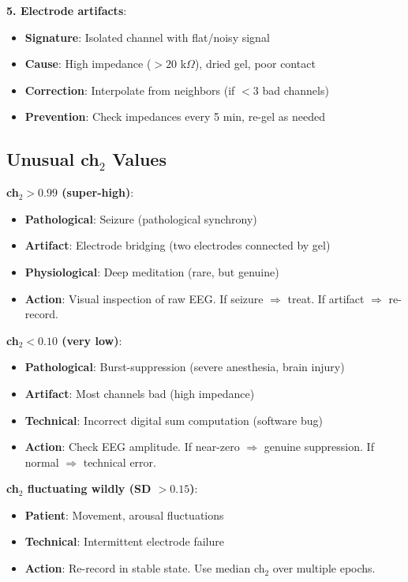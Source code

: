 \begin{theorem}
\textbf{5. Electrode artifacts}:
\begin{itemize}
\item \textbf{Signature}: Isolated channel with flat/noisy signal
\item \textbf{Cause}: High impedance ($> 20$ k$\Omega$), dried gel, poor contact
\item \textbf{Correction}: Interpolate from neighbors (if $< 3$ bad channels)
\item \textbf{Prevention}: Check impedances every 5 min, re-gel as needed
\end{itemize}
\end{theorem}

\subsection{Unusual ch\texorpdfstring{$_2$}{\_2} Values}

\begin{protocol}\label{prot:outliers}
\textbf{ch$_2 > 0.99$ (super-high)}:
\begin{itemize}
\item \textbf{Pathological}: Seizure (pathological synchrony)
\item \textbf{Artifact}: Electrode bridging (two electrodes connected by gel)
\item \textbf{Physiological}: Deep meditation (rare, but genuine)
\item \textbf{Action}: Visual inspection of raw EEG. If seizure $\Rightarrow$ treat. If artifact $\Rightarrow$ re-record.
\end{itemize}

\textbf{ch$_2 < 0.10$ (very low)}:
\begin{itemize}
\item \textbf{Pathological}: Burst-suppression (severe anesthesia, brain injury)
\item \textbf{Artifact}: Most channels bad (high impedance)
\item \textbf{Technical}: Incorrect digital sum computation (software bug)
\item \textbf{Action}: Check EEG amplitude. If near-zero $\Rightarrow$ genuine suppression. If normal $\Rightarrow$ technical error.
\end{itemize}

\textbf{ch$_2$ fluctuating wildly (SD $> 0.15$)}:
\begin{itemize}
\item \textbf{Patient}: Movement, arousal fluctuations
\item \textbf{Technical}: Intermittent electrode failure
\item \textbf{Action}: Re-record in stable state. Use median ch$_2$ over multiple epochs.
\end{itemize}
\end{protocol}


